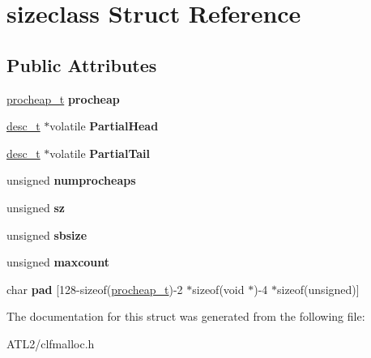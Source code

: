 \hypertarget{structsizeclass}{\section{sizeclass Struct Reference}
\label{structsizeclass}
}
\subsection*{Public Attributes}
\begin{DoxyCompactItemize}
\item 
\hypertarget{structsizeclass_ae0795facca90837e672e98908ecb680e}{\hyperlink{structprocheap}{procheap\+\_\+t} {\bfseries procheap}}\label{structsizeclass_ae0795facca90837e672e98908ecb680e}

\item 
\hypertarget{structsizeclass_a3bb3a6a52a2cd4c9662356309119305b}{\hyperlink{structdesc}{desc\+\_\+t} $\ast$volatile {\bfseries Partial\+Head}}\label{structsizeclass_a3bb3a6a52a2cd4c9662356309119305b}

\item 
\hypertarget{structsizeclass_addabc2e454706bb7670a390cb54e74c5}{\hyperlink{structdesc}{desc\+\_\+t} $\ast$volatile {\bfseries Partial\+Tail}}\label{structsizeclass_addabc2e454706bb7670a390cb54e74c5}

\item 
\hypertarget{structsizeclass_a3a7bd5e551584601513f9b0dc1ba0d08}{unsigned {\bfseries numprocheaps}}\label{structsizeclass_a3a7bd5e551584601513f9b0dc1ba0d08}

\item 
\hypertarget{structsizeclass_a0554ae8c1b1258ef3c3ce44e709b9fcf}{unsigned {\bfseries sz}}\label{structsizeclass_a0554ae8c1b1258ef3c3ce44e709b9fcf}

\item 
\hypertarget{structsizeclass_a14e3ee54066e71b7d2eeea0fb32a352f}{unsigned {\bfseries sbsize}}\label{structsizeclass_a14e3ee54066e71b7d2eeea0fb32a352f}

\item 
\hypertarget{structsizeclass_aceed83ad137fa69ce3e211e34fd32e63}{unsigned {\bfseries maxcount}}\label{structsizeclass_aceed83ad137fa69ce3e211e34fd32e63}

\item 
\hypertarget{structsizeclass_a64df2647a2c9177969456fa2c5888827}{char {\bfseries pad} \mbox{[}128-\/sizeof(\hyperlink{structprocheap}{procheap\+\_\+t})-\/2 $\ast$sizeof(void $\ast$)-\/4 $\ast$sizeof(unsigned)\mbox{]}}\label{structsizeclass_a64df2647a2c9177969456fa2c5888827}

\end{DoxyCompactItemize}


The documentation for this struct was generated from the following file\+:\begin{DoxyCompactItemize}
\item 
A\+T\+L2/clfmalloc.\+h\end{DoxyCompactItemize}

